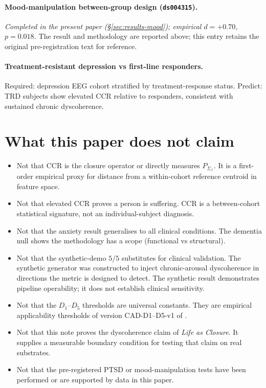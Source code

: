 \documentclass[11pt,a4paper]{article}
\begin{document}
\paragraph{Mood-manipulation between-group design (\texttt{ds004315}).} \emph{Completed in the present paper (\S\ref{sec:results-mood}); empirical $d = +0.70$, $p = 0.018$.} The result and methodology are reported above; this entry retains the original pre-registration text for reference.

\paragraph{Treatment-resistant depression vs first-line responders.} Required: depression EEG cohort stratified by treatment-response status. Predict: TRD subjects show elevated CCR relative to responders, consistent with sustained chronic dyscoherence.

\section{What this paper does not claim}\label{sec:nonclaims}

\begin{itemize}\itemsep0pt
\item Not that CCR is the closure operator or directly measures $P_{\Sigma_\mathcal{I}}$. It is a first-order empirical proxy for distance from a within-cohort reference centroid in feature space.
\item Not that elevated CCR proves a person is suffering. CCR is a between-cohort statistical signature, not an individual-subject diagnosis.
\item Not that the anxiety result generalises to all clinical conditions. The dementia null shows the methodology has a scope (functional vs structural).
\item Not that the synthetic-demo $5/5$ substitutes for clinical validation. The synthetic generator was constructed to inject chronic-arousal dyscoherence in directions the metric is designed to detect. The synthetic result demonstrates pipeline operability; it does not establish clinical sensitivity.
\item Not that the $D_1$--$D_5$ thresholds are universal constants. They are empirical applicability thresholds of version CAD-D1--D5-v1 of \citep{SmartClosureDistance}.
\item Not that this note proves the dyscoherence claim of \emph{Life as Closure}. It supplies a measurable boundary condition for testing that claim on real substrates.
\item Not that the pre-registered PTSD or mood-manipulation tests have been performed or are supported by data in this paper.
\end{itemize}
\end{document}
